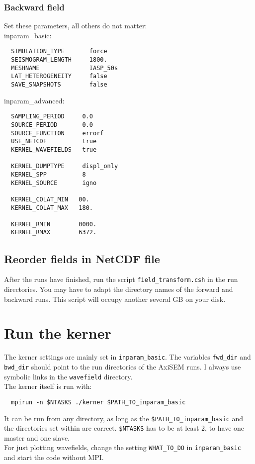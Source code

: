 \documentclass[a4wide]{scrartcl}
\begin{document}
 \subsubsection{Backward field}
 Set these parameters, all others do not matter:  \\
 inparam\_basic:
 \begin{verbatim}
  SIMULATION_TYPE     	force 
  SEISMOGRAM_LENGTH  	1800.
  MESHNAME            	IASP_50s
  LAT_HETEROGENEITY   	false
  SAVE_SNAPSHOTS       	false
 \end{verbatim}
 inparam\_advanced:
 \begin{verbatim}
  SAMPLING_PERIOD     0.0
  SOURCE_PERIOD       0.0
  SOURCE_FUNCTION     errorf
  USE_NETCDF          true
  KERNEL_WAVEFIELDS   true
  
  KERNEL_DUMPTYPE     displ_only
  KERNEL_SPP          8
  KERNEL_SOURCE       igno
  
  KERNEL_COLAT_MIN   00.
  KERNEL_COLAT_MAX   180.

  KERNEL_RMIN        0000.
  KERNEL_RMAX        6372.
 \end{verbatim}
 \subsection{Reorder fields in NetCDF file}
 After the runs have finished, run the script \verb|field_transform.csh| in the run directories. You may have to adapt the directory names of the forward and backward runs. This script will occupy another several GB on your disk. 
 
 \section{Run the kerner}
 The kerner settings are mainly set in \verb|inparam_basic|. The variables \verb|fwd_dir| and \verb|bwd_dir| should point to the run directories of the AxiSEM runs. I always use symbolic links in the \verb|wavefield| directory.\\
 The kerner itself is run with:
 \begin{verbatim}
  mpirun -n $NTASKS ./kerner $PATH_TO_inparam_basic
 \end{verbatim}
 It can be run from any directory, as long as the \verb|$PATH_TO_inparam_basic| and the directories set within are correct. \verb|$NTASKS| has to be at least 2, to have one master and one slave.\\
 For just plotting wavefields, change the setting \verb|WHAT_TO_DO| in \verb|inparam_basic| and start the code without MPI.
 
 
\end{document}
